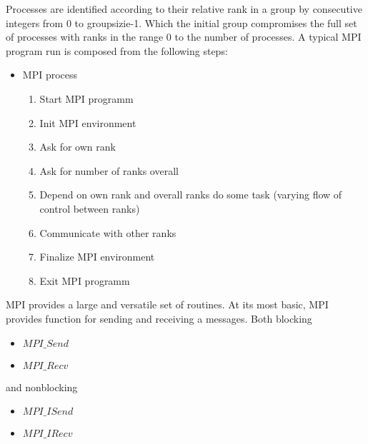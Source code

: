 Processes are identified according to their relative rank in a group by
consecutive integers from 0 to groupsizie-1. Which the initial group
compromises the full set of processes with ranks in the range 0 to 
the number of processes. A typical MPI program run is composed from
the following steps:

\begin{itemize}
  \item MPI process
    \begin{enumerate}
      \item Start MPI programm
      \item Init MPI environment
      \item Ask for own rank
      \item Ask for number of ranks overall
      \item Depend on own rank and overall ranks do some task (varying flow of control between ranks)
      \item Communicate with other ranks
      \item Finalize MPI environment
      \item Exit MPI programm
    \end{enumerate}
\end{itemize}

MPI provides a large and versatile set of routines. At its most
basic, MPI provides function for sending and receiving a messages.
Both blocking
\begin{itemize}
  \item $MPI\_Send$
  \item $MPI\_Recv$
\end{itemize}
and nonblocking
\begin{itemize}
\item $MPI\_ISend$
\item $MPI\_IRecv$
\end{itemize}

